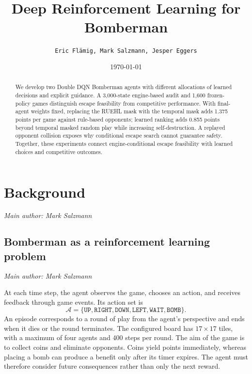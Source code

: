 \documentclass[11pt,a4paper]{article}
\title{Deep Reinforcement Learning for Bomberman}
\author{\texttt{Eric Flämig, Mark Salzmann, Jesper Eggers}}
\date{\today}
\newcommand{\contributionauthor}[1]{{\small\textit{Main author: #1}\par}}
\begin{document}
\maketitle

\begin{abstract}
We develop two Double DQN Bomberman agents with different allocations of
learned decisions and explicit guidance. A 3,000-state engine-based audit
and 1,600 frozen-policy games distinguish escape feasibility from competitive
performance. With final-agent weights fixed, replacing the RUEHL mask
with the temporal mask adds 1.375 points per game against rule-based opponents; learned
ranking adds 0.855 points beyond temporal masked random play while increasing
self-destruction. A replayed opponent collision exposes why conditional
escape search cannot guarantee safety. Together, these experiments connect
engine-conditional escape feasibility with learned choices and competitive outcomes.
\end{abstract}

\section{Background}\label{sec:theory}
\contributionauthor{Mark Salzmann}


\subsection{Bomberman as a reinforcement learning problem}
\contributionauthor{Mark Salzmann}
At each time step, the agent observes the game, chooses an action, and receives
feedback through game events. Its action set is
\[
\mathcal{A}=\{\texttt{UP}, \texttt{RIGHT}, \texttt{DOWN}, \texttt{LEFT}, \texttt{WAIT},\texttt{BOMB}\}.
\]
An episode corresponds to a round of play from the agent's perspective and
ends when it dies or the round terminates. The configured board has
$17\times17$ tiles, with a maximum of four agents and 400 steps per round.
The aim of the game is to collect coins and eliminate opponents. Coins yield points immediately, whereas placing a bomb can produce a benefit
only after its timer expires. The agent must therefore consider future
consequences rather than only the next reward.
\end{document}
